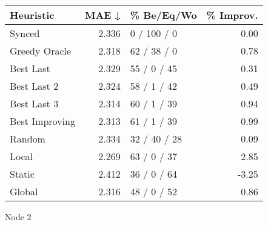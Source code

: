 \begin{tabular}{lrlr}
\toprule
\textbf{Heuristic} & \textbf{MAE ↓} & \textbf{\% Be/Eq/Wo} & \textbf{\% Improv.} \\
\midrule
            Synced &          2.336 &          0 / 100 / 0 &                0.00 \\
     Greedy Oracle &          2.318 &          62 / 38 / 0 &                0.78 \\
         Best Last &          2.329 &          55 / 0 / 45 &                0.31 \\
       Best Last 2 &          2.324 &          58 / 1 / 42 &                0.49 \\
       Best Last 3 &          2.314 &          60 / 1 / 39 &                0.94 \\
    Best Improving &          2.313 &          61 / 1 / 39 &                0.99 \\
            Random &          2.334 &         32 / 40 / 28 &                0.09 \\
             Local &          2.269 &          63 / 0 / 37 &                2.85 \\
            Static &          2.412 &          36 / 0 / 64 &               -3.25 \\
            Global &          2.316 &          48 / 0 / 52 &                0.86 \\
\bottomrule
\end{tabular}
\caption{Node 2}
\label{tab:ds_non_lr01_le1_bs4_2}
